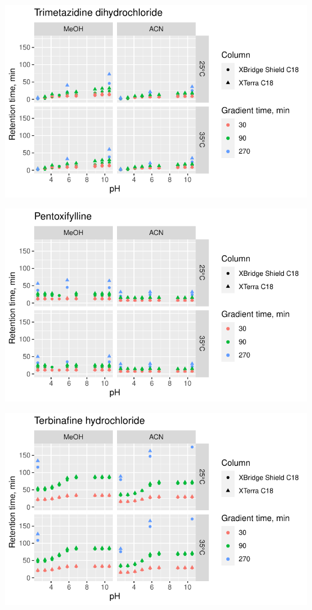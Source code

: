 \documentclass[
  letterpaper,
  DIV=11,
  numbers=noendperiod]{scrreprt}
\begin{document}
\includegraphics{index_files/figure-pdf/unnamed-chunk-4-162.pdf}

\includegraphics{index_files/figure-pdf/unnamed-chunk-4-163.pdf}

\includegraphics{index_files/figure-pdf/unnamed-chunk-4-164.pdf}
\end{document}
